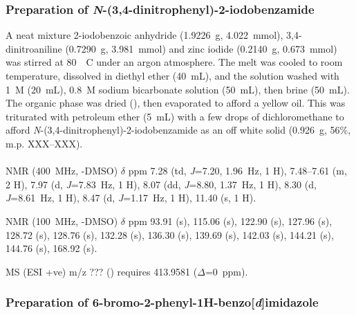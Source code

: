\begin{refsection}
\subsubsection{Preparation of \emph{N}-(3,4-dinitrophenyl)-2-iodobenzamide }
A neat mixture 2-iodobenzoic anhydride  (1.9226~g, 4.022~mmol), 3,4-dinitroaniline (0.7290~g, 3.981~mmol) and zinc iodide (0.2140~g, 0.673~mmol) was stirred at 80~\degree~C under an argon atmosphere. 
The melt was cooled to room temperature, dissolved in diethyl ether (40~mL), and the solution washed with 1~\textsc{M}  (20~mL), 0.8~\textsc{M} sodium bicarbonate solution (50~mL), then brine (50~mL).
The organic phase was dried (), then evaporated to afford a yellow oil. 
This was triturated with petroleum ether (5~mL) with a few drops of dichloromethane to afford \emph{N}-(3,4-dinitrophenyl)-2-iodobenzamide  as an off white solid (0.926~g, 56\%, m.p. XXX--XXX).\autocite{Shivani2007}

\footnotesize\paragraph{}

 NMR (400~MHz, -DMSO) $\delta$ ppm
7.28 (td, \emph{J}=7.20, 1.96~Hz, 1 H),
7.48--7.61 (m, 2 H),
7.97 (d, \emph{J}=7.83~Hz, 1 H),
8.07 (dd, \emph{J}=8.80, 1.37~Hz, 1 H),
8.30 (d, \emph{J}=8.61~Hz, 1 H),
8.47 (d, \emph{J}=1.17~Hz, 1 H),
11.40 (s, 1 H).

 NMR (100~MHz, -DMSO) $\delta$ ppm
93.91 (s),
115.06 (s),
122.90 (s),
127.96 (s),
128.72 (s),
128.76 (s),
132.28 (s),
136.30 (s),
139.69 (s),
142.03 (s),
144.21 (s),
144.76 (s),
168.92 (s).

MS (ESI +ve) m/z ??? ()  requires 413.9581 ($\Delta$=0~ppm).

\normalsize

\subsubsection{Preparation of 6-bromo-2-phenyl-1\textbf{H}-benzo[\emph{d}]imidazole}

\printbibliography[heading=subbibliography]
\end{refsection}
